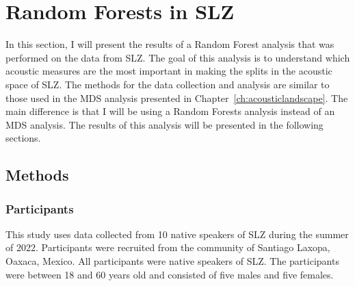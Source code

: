 \section{Random Forests in SLZ} \label{sec:bagging_slz}

In this section, I will present the results of a Random Forest analysis that was performed on the data from SLZ. The goal of this analysis is to understand which acoustic measures are the most important in making the splits in the acoustic space of SLZ. The methods for the data collection and analysis are similar to those used in the MDS analysis presented in Chapter~\ref{ch:acousticlandscape}. The main difference is that I will be using a Random Forests analysis instead of an MDS analysis. The results of this analysis will be presented in the following sections.

\subsection{Methods} \label{sec:methods}
\subsubsection{Participants} \label{sec:participants}
This study uses data collected from 10 native speakers of SLZ during the summer of 2022. Participants were recruited from the community of Santiago Laxopa, Oaxaca, Mexico. All participants were native speakers of SLZ. The participants were between 18 and 60 years old and consisted of five males and five females.

